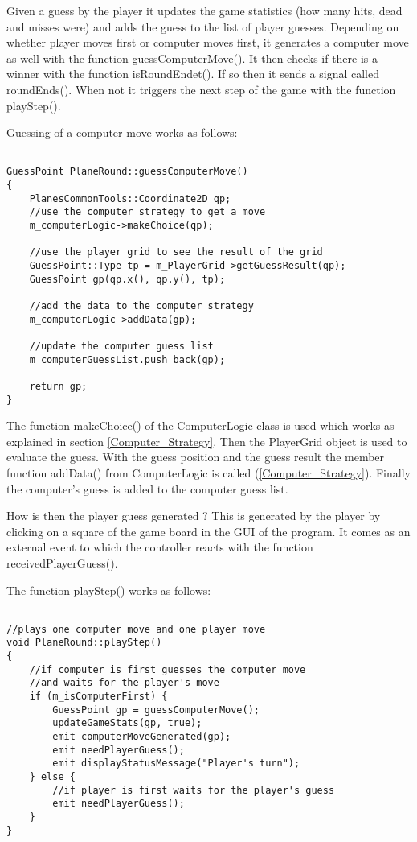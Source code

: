 Given a guess by the player it updates the game statistics (how many hits, dead and misses were) and adds the guess to the list of player guesses. Depending on whether player moves first or computer moves first, it generates a computer move as well with the function guessComputerMove(). It then checks if there is a winner with the function isRoundEndet(). If so then it sends a signal called roundEnds(). When not it triggers the next step of the game with the function playStep().

Guessing of a computer move works as follows:

\begin{lstlisting}

GuessPoint PlaneRound::guessComputerMove()
{
	PlanesCommonTools::Coordinate2D qp;
	//use the computer strategy to get a move
	m_computerLogic->makeChoice(qp);
	
	//use the player grid to see the result of the grid
	GuessPoint::Type tp = m_PlayerGrid->getGuessResult(qp);
	GuessPoint gp(qp.x(), qp.y(), tp);
	
	//add the data to the computer strategy
	m_computerLogic->addData(gp);
	
	//update the computer guess list
	m_computerGuessList.push_back(gp);
	
	return gp;
}

\end{lstlisting}

The function makeChoice() of the ComputerLogic class is used which works as explained in section \ref{Computer_Strategy}. Then the PlayerGrid object is used to evaluate the guess. With the guess position and the guess result the member function addData() from ComputerLogic is called (\ref{Computer_Strategy}). Finally the computer's guess is added to the computer guess list. 

How is then the player guess generated ? This is generated by the player by clicking on a square of the game board in the GUI of the program. It comes as an external event to which the controller reacts with the function receivedPlayerGuess().

The function playStep() works as follows:

\begin{lstlisting}

//plays one computer move and one player move
void PlaneRound::playStep()
{
	//if computer is first guesses the computer move
	//and waits for the player's move
	if (m_isComputerFirst) {
		GuessPoint gp = guessComputerMove();
		updateGameStats(gp, true);
		emit computerMoveGenerated(gp);
		emit needPlayerGuess();
		emit displayStatusMessage("Player's turn");
	} else {
		//if player is first waits for the player's guess
		emit needPlayerGuess();
	}
}

\end{lstlisting}

